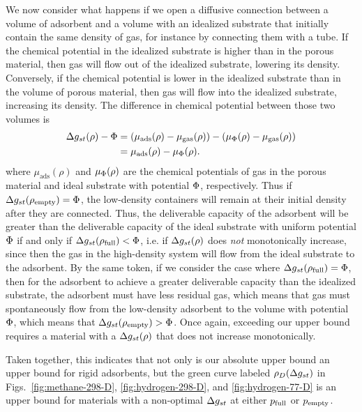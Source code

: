 We now consider what happens if we open a diffusive connection between a
volume of adsorbent and a volume with an idealized substrate that initially contain
the same density of gas, for instance by connecting them with a tube. If the
chemical potential in the idealized substrate is higher than in the porous material,
then gas will flow out of the idealized substrate, lowering its density.  Conversely,
if the chemical potential is lower in the idealized substrate than in the
volume of porous material, then gas will flow into the idealized substrate, increasing
its density.
The difference in chemical potential between those two volumes is
\begin{align}
   \Delta g_{st}(\rho) - \Phi &= \left(\mu_{\text{ads}}(\rho) - \mu_{\text{gas}}(\rho)\right)
   - \left(\mu_{\Phi}(\rho) - \mu_{\text{gas}}(\rho)\right)
   \\
   &= \mu_{\text{ads}}(\rho) - \mu_{\Phi}(\rho).
\end{align}
where $\mu_{\text{ads}}(\rho)$ and $\mu_{\Phi}(\rho)$ are the chemical potentials
of gas in the porous material and ideal substrate with potential $\Phi$, respectively.
Thus if $\Delta g_{st}(\rho_{\text{empty}}) =
\Phi$, the low-density containers will remain at their initial density after
they are connected. Thus, the deliverable capacity of the adsorbent will be greater
than the deliverable capacity of the ideal substrate with uniform potential $\Phi$ if and
only if $\Delta g_{st}(\rho_{\text{full}})<\Phi$, i.e. if $\Delta g_{st}(\rho)$ does \emph{not} monotonically
increase, since then the gas in the high-density system will flow from the ideal
substrate to the adsorbent. By the same token, if we consider the case where
$\Delta g_{st}(\rho_{\text{full}}) = \Phi$, then for the adsorbent to achieve a greater deliverable
capacity than the idealized substrate, the adsorbent must have less residual gas,
which means that gas must spontaneously flow from the low-density adsorbent to the
volume with potential $\Phi$, which means that $\Delta g_{st}(\rho_{\text{empty}})>\Phi$. Once again,
exceeding our upper bound requires a material with a $\Delta g_{st}(\rho)$ that does not
increase monotonically.

Taken together, this indicates that not only is our absolute upper bound an
upper bound for rigid adsorbents, but the green curve labeled $\rho_D(\Delta g_{st})$ in
Figs.~\ref{fig:methane-298-D}, \ref{fig:hydrogen-298-D}, and
\ref{fig:hydrogen-77-D} is an upper bound for materials with a non-optimal
$\Delta g_{st}$ at either $p_{\text{full}}$ or $p_{\text{empty}}$.


